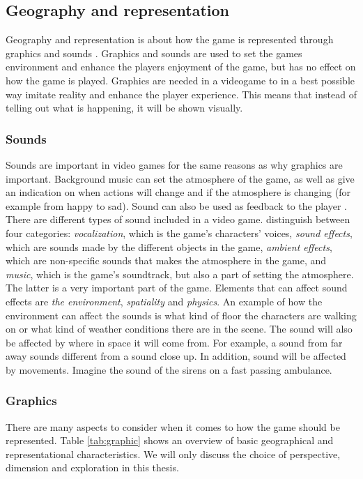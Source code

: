 \subsection{Geography and representation}
\label{sec:georep}
Geography and representation is about how the game is represented through graphics and sounds \cite{understandingvg}. Graphics and sounds are used to set the games environment and enhance the players enjoyment of the game, but has no effect on how the game is played. Graphics are needed in a videogame to in a best possible way imitate reality and enhance the player experience. This means that instead of telling out what is happening, it will be shown visually. 

\subsubsection{Sounds}
Sounds are important in video games for the same reasons as why graphics are important. Background music can set the atmosphere of the game, as well as give an indication on when actions will change and if the atmosphere is changing (for example from happy to sad). Sound can also be used as feedback to the player \cite{umlapproach}. There are different types of sound included in a  video game. \cite{understandingvg} distinguish between four categories:
\emph{vocalization}, which is the game’s characters’ voices,
\emph{sound effects}, which are sounds made by the different objects in the game, \emph{ambient effects}, which are non-specific sounds that makes the atmosphere in the game, and \emph{music}, which is the game’s soundtrack, but also a part of setting the atmosphere. The latter is a very important part of the game. Elements that can affect sound effects are \emph{the environment}, \emph{spatiality} and \emph{physics}. An example of how the environment can affect the sounds is what kind of floor the characters are walking on or what kind of weather conditions there are in the scene. The sound will also be affected by where in space it will come from. For example, a sound from far away sounds different from a sound close up. In addition, sound will be affected by movements. Imagine the sound of the sirens on a fast passing ambulance.

\subsubsection{Graphics}
There are many aspects to consider when it comes to how the game should be represented. Table \ref{tab:graphic} shows an overview of basic geographical and representational characteristics. We will only discuss the choice of perspective, dimension and exploration in this thesis. 

